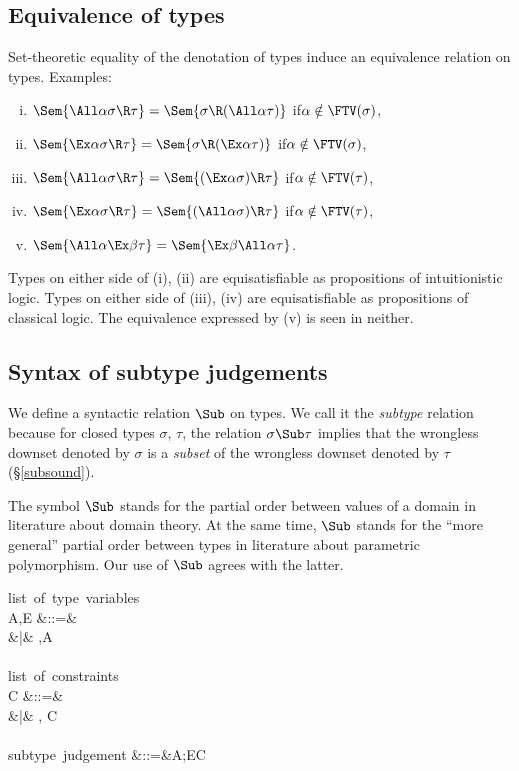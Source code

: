 \documentclass{amsart}
\theoremstyle{definition}
\begin{document}
\subsection{Equivalence of types}
Set-theoretic equality of the denotation of types induce an
equivalence relation on types. Examples:
\begin{enumerate}[(i)]
\item
$\Sem{\All\alpha\sigma\R\tau}=\Sem{\sigma\R(\All\alpha\tau)}$
\quad if\quad $\alpha\notin\FTV(\sigma)$,
\item
$\Sem{\Ex\alpha\sigma\R\tau}=\Sem{\sigma\R(\Ex\alpha\tau)}$
\quad if\quad $\alpha\notin\FTV(\sigma)$,
\item
$\Sem{\All\alpha\sigma\R\tau}=\Sem{(\Ex\alpha\sigma)\R\tau}$
\quad if\quad $\alpha\notin\FTV(\tau)$,
\item
$\Sem{\Ex\alpha\sigma\R\tau}=\Sem{(\All\alpha\sigma)\R\tau}$
\quad if\quad $\alpha\notin\FTV(\tau)$,
\item
$\Sem{\All\alpha\Ex\beta\tau}=\Sem{\Ex\beta\All\alpha\tau}$.
\end{enumerate}
Types on either side of (i), (ii) are equisatisfiable as
propositions of intuitionistic logic. Types on either side of
(iii), (iv) are equisatisfiable as propositions of classical
logic. The equivalence expressed by (v) is seen in neither.


\subsection{Syntax of subtype judgements}

We define a syntactic relation $\Sub$ on types. We call it the
\emph{subtype} relation because for closed types $\sigma$,
$\tau$, the relation $\sigma \Sub \tau$ implies that the
wrongless downset denoted by $\sigma$ is a \emph{subset} of the
wrongless downset denoted by $\tau$ (\S\ref{subsound}).

The symbol $\Sub$ stands for the partial order between values of
a domain in literature about domain theory. At the same time,
$\Sub$ stands for the ``more general'' partial order between
types in literature about parametric polymorphism. Our use of
$\Sub$ agrees with the latter.

\begin{syntax}
\mbox{list of type variables}\\
A,E
&::=& \emptyset \\
&|& \alpha,A
\\
\\
\mbox{list of constraints}\\
C
&::=& \emptyset \\
&|& \sigma \Sub \tau, C
\\
\\
\mbox{subtype judgement}
&::=&A;E\vdash C
\end{syntax}
\end{document}
